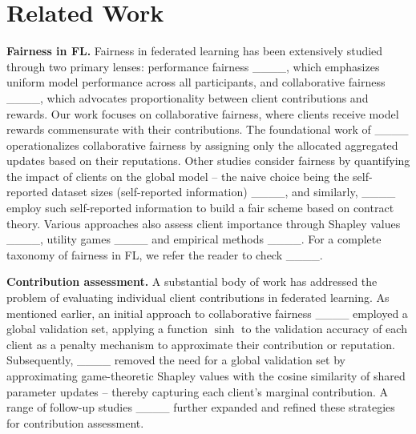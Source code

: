 \section{Related Work}
\label{section: related-work}

\textbf{Fairness in FL.} Fairness in federated learning has been extensively studied through two primary lenses: performance fairness ____, which emphasizes uniform model performance across all participants, and collaborative fairness ____, which advocates proportionality between client contributions and rewards. Our work focuses on collaborative fairness, where clients receive model rewards commensurate with their contributions. The foundational work of ____ operationalizes collaborative fairness by assigning only the allocated aggregated updates based on their reputations. 
Other studies consider fairness by quantifying the impact of clients on the global model -- the naive choice being the self-reported dataset sizes (self-reported information) ____, and similarly, ____ employ such self-reported information to build a fair scheme based on contract theory. Various approaches also assess client importance through Shapley values ____, utility games ____ and empirical methods ____. For a complete taxonomy of fairness in FL, we refer the reader to check ____. 

\textbf{Contribution assessment.} A substantial body of work has addressed the problem of evaluating individual client contributions in federated learning. As mentioned earlier, an initial approach to collaborative fairness ____ employed a global validation set, applying a function $\sinh$ to the validation accuracy of each client as a penalty mechanism to approximate their contribution or reputation. Subsequently, ____ removed the need for a global validation set by approximating game-theoretic Shapley values with the cosine similarity of shared parameter updates -- thereby capturing each client's marginal contribution. A range of follow-up studies ____ further expanded and refined these strategies for contribution assessment. 

